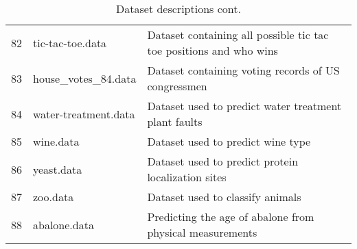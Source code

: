 \begin{table}
{\begin{tabular}{lll}
82 &                         tic-tac-toe.data & Dataset containing all possible tic tac toe positions and who wins\\
83 &                      house\_votes\_84.data & Dataset containing voting records of US congressmen\\
84 &                     water-treatment.data & Dataset used to predict water treatment plant faults\\
85 &                                wine.data & Dataset used to predict wine type\\
86 &                               yeast.data & Dataset used to predict protein localization sites\\
87 &                                 zoo.data & Dataset used to classify animals\\
88 &                             abalone.data &  Predicting the age of abalone from physical measurements\\
\bottomrule
\end{tabular}}
\caption{Dataset descriptions cont.}
\end{table}
\par

\pagebreak
